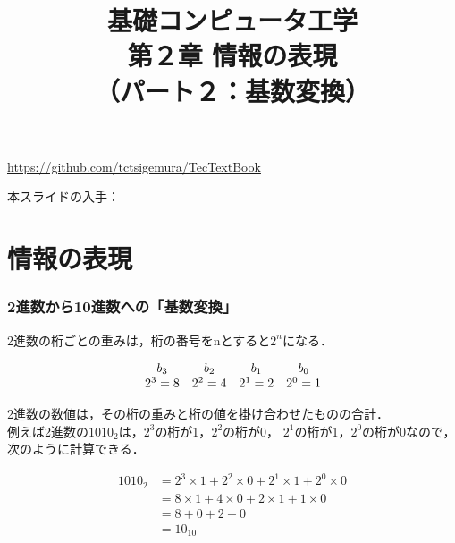 \documentclass[handout]{beamer}        %
\begin{document}
\title{基礎コンピュータ工学\\第２章 情報の表現\\
       （パート２：基数変換）}
\date{}

\begin{frame}
  \titlepage
  \centerline{\url{https://github.com/tctsigemura/TecTextBook}}
  \vfill
  \centerline{本スライドの入手：
    }
\end{frame}


\section{情報の表現}
\begin{frame}
  \frametitle{2進数から10進数への「基数変換」}
  2進数の桁ごとの重みは，桁の番号をnとすると$2^n$になる．

\[
\begin{array}{c c c c c }
b_3     & b_2     & b_1     & b_0     \\
2^3 = 8 & 2^2 = 4 & 2^1 = 2 & 2^0 = 1 \\
\end{array}
\]

2進数の数値は，その桁の重みと桁の値を掛け合わせたものの合計．\\
例えば2進数の$1010_2$は，$2^3$の桁が1，$2^2$の桁が0，
$2^1$の桁が1，$2^0$の桁が0なので，
次のように計算できる．

\begin{align*}
1010_2 &= 2^3 \times 1 + 2^2 \times 0 + 2^1 \times 1 + 2^0 \times 0 \\
       &= 8 \times 1 + 4 \times 0 + 2 \times 1 + 1 \times 0 \\
       &= 8 + 0 + 2 + 0 \\
       &= 10_{10}
\end{align*}
\end{frame}
\end{document}
